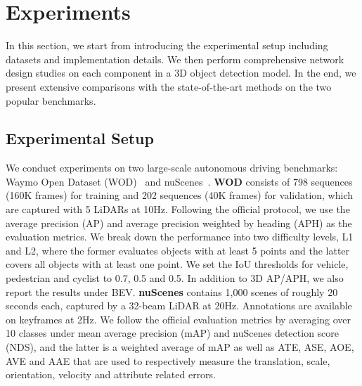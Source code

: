 \documentclass[10pt,twocolumn,letterpaper]{article}
\begin{document}
\section{Experiments}

In this section, we start from introducing the experimental setup including datasets and implementation details. We then perform comprehensive network design studies on each component in a 3D object detection model. In the end, we present extensive comparisons with the state-of-the-art methods on the two popular benchmarks. 

\subsection{Experimental Setup}
We conduct experiments on two large-scale autonomous driving benchmarks: Waymo Open Dataset (WOD)~\cite{Sun_2020_CVPR} and nuScenes~\cite{caesar2020nuscenes}. \textbf{WOD} consists of 798 sequences (160K frames) for training and 202 sequences (40K frames) for validation, which are captured with 5 LiDARs at 10Hz. Following the official protocol, we use the average precision (AP) and average precision weighted by heading (APH) as the evaluation metrics. We break down the performance into two difficulty levels, L1 and L2, where the former evaluates objects with at least 5 points and the latter covers all objects with at least one point. We set the IoU thresholds for vehicle, pedestrian and cyclist to 0.7, 0.5 and 0.5. In addition to 3D AP/APH, we also report the results under BEV. \textbf{nuScenes} contains 1,000 scenes of roughly 20 seconds each, captured by a 32-beam LiDAR at 20Hz. Annotations are available on keyframes at 2Hz. We follow the official evaluation metrics by averaging over 10 classes under mean average precision (mAP) and nuScenes detection score (NDS), and the latter is a weighted average of mAP as well as ATE, ASE, AOE, AVE and AAE that are used to respectively measure the translation, scale, orientation, velocity and attribute related errors. 
\end{document}
